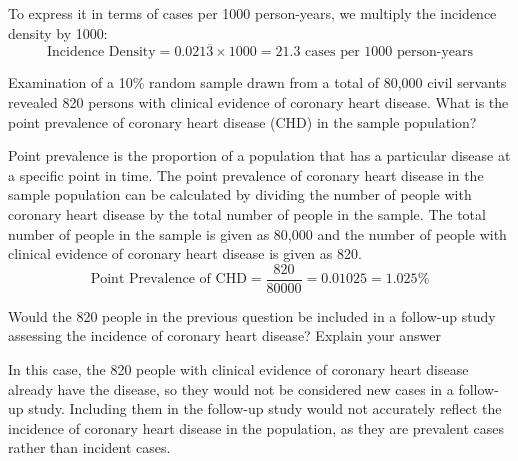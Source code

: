 \documentclass[a4paper]{exam}
\begin{document}
\begin{questions}
\begin{solution}
        To express it in terms of cases per 1000 person-years, we multiply the incidence density by 1000:
        \begin{equation*}
            \text{Incidence Density} = 0.021\overline{3} \times 1000 = 21.3 \text{ cases per 1000 person-years}
        \end{equation*}
    \end{solution}

    \question[10]
    Examination of a 10\% random sample drawn from a total of 80,000 civil servants revealed 820 persons with clinical evidence of coronary heart disease. What is the point prevalence of coronary heart disease (CHD) in the sample population?

    \begin{solution}
        Point prevalence is the proportion of a population that has a particular disease at a specific point in time. The point prevalence of coronary heart disease in the sample population can be calculated by dividing the number of people with coronary heart disease by the total number of people in the sample.
        The total number of people in the sample is given as 80,000 and the number of people with clinical evidence of coronary heart disease is given as 820.
        \begin{equation*}
            \text{Point Prevalence of CHD} = \frac{820}{80000} = 0.01025 = 1.025\%
        \end{equation*}
    \end{solution}

    \question[10]
    Would the 820 people in the previous question be included in a follow-up study assessing the incidence of coronary heart disease? Explain your answer
    \begin{solution}
        In this case, the 820 people with clinical evidence of coronary heart disease already have the disease, so they would not be considered new cases in a follow-up study. Including them in the follow-up study would not accurately reflect the incidence of coronary heart disease in the population, as they are prevalent cases rather than incident cases.
    \end{solution}


\end{questions}
\end{document}
